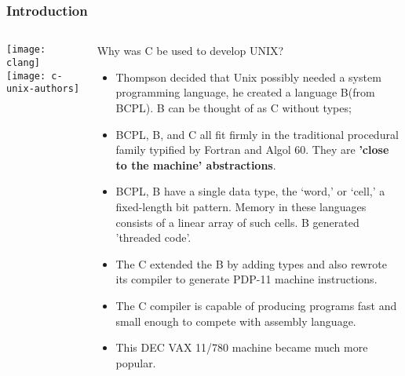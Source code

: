 \begin{frame}[plain]
	\frametitle{Introduction}
	
	
	
	\begin{columns}
		
		\begin{column}{.3\textwidth}
			
			\texttt{[image: clang]}
			\texttt{[image: c-unix-authors]}
		\end{column}
		
		\begin{column}{.7\textwidth}
			
			\Large
			Why was C be used to develop UNIX?
			\normalsize
			\begin{itemize}
				\item  Thompson decided that Unix possibly needed a system programming language, he created a language B(from BCPL). B can be thought of as C without types;
				\item  BCPL, B, and C all fit firmly in the traditional procedural family typified by Fortran and Algol 60. They are \textbf{'close to the machine' abstractions}.
				
				\item BCPL, B have a single data type, the `word,' or `cell,' a fixed-length bit pattern. Memory in these languages consists of a linear array of such cells.  B generated 'threaded code'.
				
				\item The C extended the B  by adding types and also rewrote its compiler to generate PDP-11 machine instructions.
				
				\item The C compiler is capable of producing programs fast and small enough to compete with assembly language.
				
				\item This DEC VAX 11/780 machine became much more popular.
			\end{itemize}
			
		\end{column}
		
		
	\end{columns}
	
	
\end{frame}

